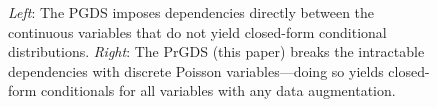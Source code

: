 \documentclass{article}
\begin{document}
\begin{figure}[t]
\centering
{}\hfill
% 
\caption{\label{fig:comparison} \footnotesize \emph{Left}: The PGDS imposes dependencies directly between the continuous variables that do not yield closed-form conditional distributions. \emph{Right}: The PrGDS (this paper) breaks the intractable dependencies with discrete Poisson variables---doing so yields closed-form conditionals for all variables with any data augmentation.~}\vspace{-1.5em}
\end{figure}
\end{document}
